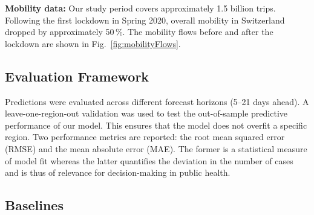 \documentclass[sigconf, review = false, nonacm = true]{acmart}
\begin{document}
\textbf{Mobility data:} Our study period covers approximately 1.5 billion trips. Following the first lockdown in Spring 2020, overall mobility in Switzerland dropped by approximately 50\,\%. The mobility flows before and after the lockdown are shown in Fig.~\ref{fig:mobilityFlows}.


\subsection{Evaluation Framework}

Predictions were evaluated across different forecast horizons (5--21 days ahead). A leave-one-region-out validation was used to test the out-of-sample predictive performance of our model. This ensures that the model does not overfit a specific region. Two performance metrics are reported: the root mean squared error (RMSE) and the mean absolute error (MAE). The former is a statistical measure of model fit whereas the latter quantifies the deviation in the number of cases and is thus of relevance for decision-making in public health. 

\subsection{Baselines}
\end{document}
